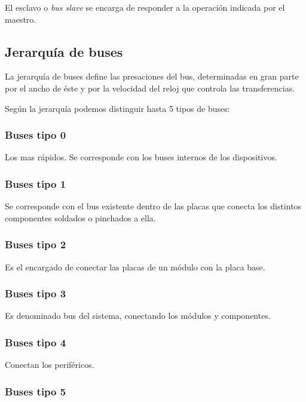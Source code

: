 \documentclass[a4paper, 11pt, titlepage]{article}
\begin{document}
        El esclavo o \textit{bus slave} se encarga de responder a la operación indicada por el maestro.

    \subsection{Jerarquía de buses}

        La jerarquía de buses define las presaciones del bus, determinadas en gran parte por el ancho de 
        éste y por la velocidad del reloj que controla las transferencias.

        Según la jerarquía podemos distinguir hasta 5 tipos de buses:

        \subsubsection{Buses tipo 0}

            Los mas rápidos. Se corresponde con los buses internos de los dispositivos.
        
        \subsubsection{Buses tipo 1}

            Se corresponde con el bus existente dentro de las placas que conecta los distintos componentes 
            soldados o pinchados a ella.

        \subsubsection{Buses tipo 2}

            Es el encargado de conectar las placas de un módulo con la placa base.

        \subsubsection{Buses tipo 3}

            Es denominado bus del sistema, conectando los módulos y componentes.

        \subsubsection{Buses tipo 4}

            Conectan los periféricos.

        \subsubsection{Buses tipo 5}
\end{document}
